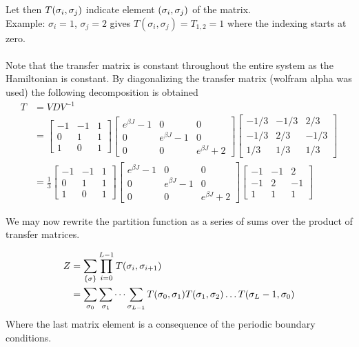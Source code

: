 \documentclass[12pt]{article}
\begin{document}
Let then $T\qty(\sigma_i, \sigma_j)$ indicate element $\qty(\sigma_i,
\sigma_j)$ of the matrix.\\
Example: $\sigma_i = 1$, $\sigma_j = 2$ gives $T(\sigma_i, \sigma_j) = T_{1, 2}
= 1$ where the indexing starts at zero.\\
\\
Note that the transfer matrix is constant throughout the entire system as the
Hamiltonian is constant. By diagonalizing the transfer matrix (wolfram
alpha was used) the following decomposition is obtained
\begin{align*}
    T &= VDV^{-1} \\
    &= \begin{bmatrix}-1&-1&1\\0&1&1\\1&0&1\end{bmatrix}
    \begin{bmatrix}e^{\beta J}-1&0&0\\0&e^{\beta J}-1&0\\0&0&e^{\beta
    J}+2\end{bmatrix}
    \begin{bmatrix}-1/3&-1/3&2/3\\-1/3&2/3&-1/3\\1/3&1/3&1/3\end{bmatrix}\\
    &= \frac{1}{3}\begin{bmatrix}-1&-1&1\\0&1&1\\1&0&1\end{bmatrix}
    \begin{bmatrix}e^{\beta J}-1&0&0\\0&e^{\beta J}-1&0\\0&0&e^{\beta
    J}+2\end{bmatrix} \begin{bmatrix}-1&-1&2\\-1&2&-1\\1&1&1\end{bmatrix}
\end{align*}

We may now rewrite the partition function as a series of sums over the product
of transfer matrices.

\begin{align*}
    Z &= \sum_{\{\sigma\}} \prod_{i=0}^{L-1}T\qty(\sigma_i, \sigma_{i+1}) \\
    &= \sum_{\sigma_0}\sum_{\sigma_1}\dots\sum_{\sigma_{L-1}}T\qty(\sigma_0,
    \sigma_1)T(\sigma_1, \sigma_2)\dots T\qty(\sigma_L-1, \sigma_0)
\end{align*}
Where the last matrix element is a consequence of the periodic boundary
    conditions.
\end{document}
